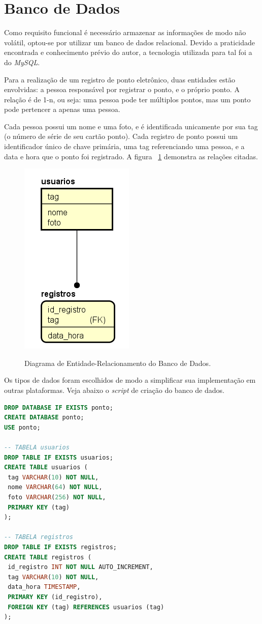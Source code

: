 \section{Banco de Dados}

Como requisito funcional é necessário armazenar as informações de modo não volátil, optou-se por utilizar um banco de dados relacional. Devido a praticidade encontrada e conhecimento prévio do autor, a tecnologia utilizada para tal foi a do \textit{MySQL}.

Para a realização de um registro de ponto eletrônico, duas entidades estão envolvidas: a pessoa responsável por registrar o ponto, e o próprio ponto. A relação é de 1-n, ou seja: uma pessoa pode ter múltiplos pontos, mas um ponto pode pertencer a apenas uma pessoa.

Cada pessoa possui um nome e uma foto, e é identificada unicamente por sua tag (o número de série de seu cartão ponto). Cada registro de ponto possui um identificador único de chave primária, uma tag referenciando uma pessoa, e a data e hora que o ponto foi registrado. A figura ~\ref{diagrama_er} demonstra as relações citadas.

\begin{figure}[h]
	\centering
	\caption{Diagrama de Entidade-Relacionamento do Banco de Dados.}
	\includegraphics[scale=1]{imagens/bd_diagrama_er.png}
	\label{diagrama_er}
\end{figure}

Os tipos de dados foram escolhidos de modo a simplificar sua implementação em outras plataformas. Veja abaixo o \textit{script} de criação do banco de dados.

\renewcommand{\lstlistingname}{Código}
\begin{lstlisting}[language=SQL, label=bd_criacao, caption=Código de criação do banco de dados.]
DROP DATABASE IF EXISTS ponto;
CREATE DATABASE ponto;
USE ponto;

-- TABELA usuarios
DROP TABLE IF EXISTS usuarios;
CREATE TABLE usuarios (
 tag VARCHAR(10) NOT NULL,
 nome VARCHAR(64) NOT NULL,
 foto VARCHAR(256) NOT NULL,
 PRIMARY KEY (tag)
);

-- TABELA registros
DROP TABLE IF EXISTS registros;
CREATE TABLE registros (
 id_registro INT NOT NULL AUTO_INCREMENT,
 tag VARCHAR(10) NOT NULL,
 data_hora TIMESTAMP,
 PRIMARY KEY (id_registro),
 FOREIGN KEY (tag) REFERENCES usuarios (tag)
);
\end{lstlisting}